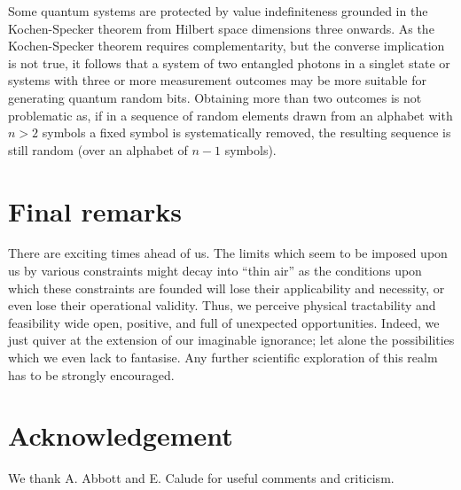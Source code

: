 \documentclass[12pt]{article}
\begin{document}
Some quantum systems are protected by value indefiniteness grounded in the Kochen-Specker theorem
from Hilbert space dimensions three onwards.
As
the Kochen-Specker theorem requires complementarity, but the converse implication is not true, it follows that
 a system of two entangled photons in a singlet state
or systems with three or more
measurement outcomes may be more suitable for generating quantum random bits.
Obtaining more than two outcomes is not problematic as, if in a sequence of random elements drawn from an alphabet with $n>2$ symbols
 a fixed symbol is systematically removed, the resulting sequence is still random (over an alphabet of $n-1$
 symbols).




\section*{Final remarks}

There are exciting times ahead of us.
The limits which seem to be imposed upon us by various constraints
might decay into ``thin air'' as the conditions upon which these constraints are founded will lose their applicability and necessity, or even lose their operational validity.
Thus, we perceive physical tractability and feasibility wide open, positive, and full of unexpected opportunities.
Indeed, we just quiver at the extension of our imaginable ignorance; let alone the possibilities which we even lack to fantasise.
Any further scientific exploration of this realm has to be strongly encouraged.

\section*{Acknowledgement}
We thank A. Abbott and E. Calude for useful comments and criticism.

%
%
\end{document}
